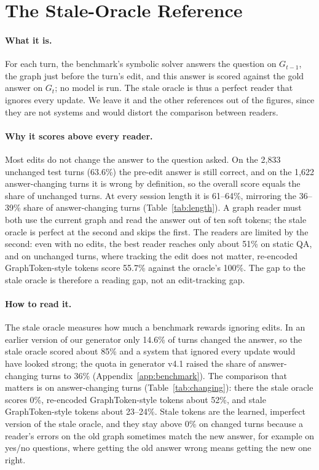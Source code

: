 \documentclass[11pt]{article}
\begin{document}
\section{The Stale-Oracle Reference}
\label{app:stale}

\paragraph{What it is.}
For each turn, the benchmark's symbolic solver answers the question on $G_{t-1}$, the graph just before the turn's edit, and this answer is scored against the gold answer on $G_t$; no model is run.
The stale oracle is thus a perfect reader that ignores every update.
We leave it and the other references out of the figures, since they are not systems and would distort the comparison between readers.

\paragraph{Why it scores above every reader.}
Most edits do not change the answer to the question asked.
On the 2{,}833 unchanged test turns (63.6\%) the pre-edit answer is still correct, and on the 1{,}622 answer-changing turns it is wrong by definition, so the overall score equals the share of unchanged turns.
At every session length it is 61--64\%, mirroring the 36--39\% share of answer-changing turns (Table~\ref{tab:length}).
A graph reader must both use the current graph and read the answer out of ten soft tokens; the stale oracle is perfect at the second and skips the first.
The readers are limited by the second: even with no edits, the best reader reaches only about 51\% on static QA, and on unchanged turns, where tracking the edit does not matter, re-encoded GraphToken-style tokens score 55.7\% against the oracle's 100\%.
The gap to the stale oracle is therefore a reading gap, not an edit-tracking gap.

\paragraph{How to read it.}
The stale oracle measures how much a benchmark rewards ignoring edits.
In an earlier version of our generator only 14.6\% of turns changed the answer, so the stale oracle scored about 85\% and a system that ignored every update would have looked strong; the quota in generator v4.1 raised the share of answer-changing turns to 36\% (Appendix~\ref{app:benchmark}).
The comparison that matters is on answer-changing turns (Table~\ref{tab:changing}): there the stale oracle scores 0\%, re-encoded GraphToken-style tokens about 52\%, and stale GraphToken-style tokens about 23--24\%.
Stale tokens are the learned, imperfect version of the stale oracle, and they stay above 0\% on changed turns because a reader's errors on the old graph sometimes match the new answer, for example on yes/no questions, where getting the old answer wrong means getting the new one right.
\end{document}
